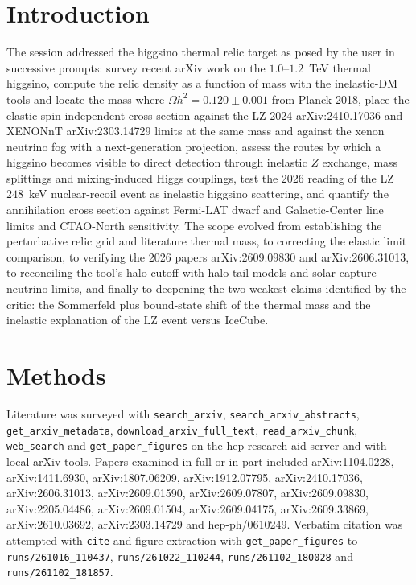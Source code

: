 \documentclass[11pt,a4paper]{article}
\begin{document}
\section{Introduction}
The session addressed the higgsino thermal relic target as posed by the user in successive prompts: survey recent arXiv work on the $1.0$--$1.2$~TeV thermal higgsino, compute the relic density as a function of mass with the inelastic-DM tools and locate the mass where $\Omega h^{2}=0.120\pm0.001$ from Planck 2018, place the elastic spin-independent cross section against the LZ 2024 arXiv:2410.17036 and XENONnT arXiv:2303.14729 limits at the same mass and against the xenon neutrino fog with a next-generation projection, assess the routes by which a higgsino becomes visible to direct detection through inelastic $Z$ exchange, mass splittings and mixing-induced Higgs couplings, test the 2026 reading of the LZ $248$~keV nuclear-recoil event as inelastic higgsino scattering, and quantify the annihilation cross section against Fermi-LAT dwarf and Galactic-Center line limits and CTAO-North sensitivity. The scope evolved from establishing the perturbative relic grid and literature thermal mass, to correcting the elastic limit comparison, to verifying the 2026 papers arXiv:2609.09830 and arXiv:2606.31013, to reconciling the tool's halo cutoff with halo-tail models and solar-capture neutrino limits, and finally to deepening the two weakest claims identified by the critic: the Sommerfeld plus bound-state shift of the thermal mass and the inelastic explanation of the LZ event versus IceCube.

\section{Methods}
Literature was surveyed with \texttt{search\_arxiv}, \texttt{search\_arxiv\_abstracts}, \texttt{get\_arxiv\_metadata}, \texttt{download\_arxiv\_full\_text}, \texttt{read\_arxiv\_chunk}, \texttt{web\_search} and \texttt{get\_paper\_figures} on the hep-research-aid server and with local arXiv tools. Papers examined in full or in part included arXiv:1104.0228, arXiv:1411.6930, arXiv:1807.06209, arXiv:1912.07795, arXiv:2410.17036, arXiv:2606.31013, arXiv:2609.01590, arXiv:2609.07807, arXiv:2609.09830, arXiv:2205.04486, arXiv:2609.01504, arXiv:2609.04175, arXiv:2609.33869, arXiv:2610.03692, arXiv:2303.14729 and hep-ph/0610249. Verbatim citation was attempted with \texttt{cite} and figure extraction with \texttt{get\_paper\_figures} to \texttt{runs/261016\_110437}, \texttt{runs/261022\_110244}, \texttt{runs/261102\_180028} and \texttt{runs/261102\_181857}.
\end{document}
